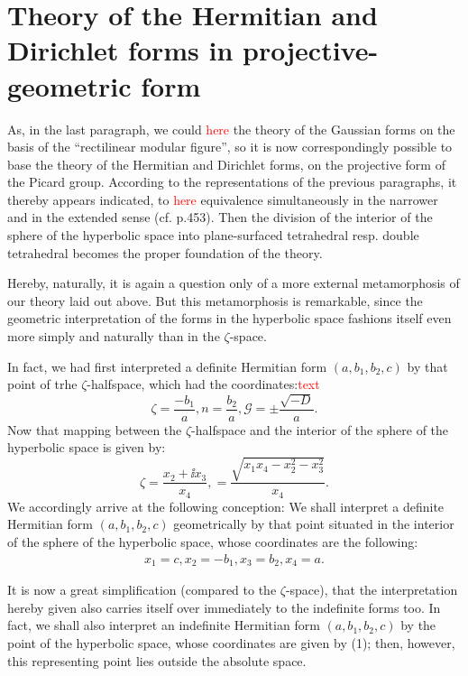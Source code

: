 \section{Theory of the Hermitian and Dirichlet forms in projective-geometric form}

As, in the last paragraph, we could \textcolor{red}{here} the theory of the Gaussian forms on the basis of the “rectilinear modular figure”, so it is now correspondingly possible to base the theory of the Hermitian and Dirichlet forms, on the projective form of the Picard group. According to the representations of the previous paragraphs, it thereby appears indicated, to \textcolor{red}{here} equivalence simultaneously in the narrower and in the extended sense (cf. p.453). Then the division of the interior of the sphere of the hyperbolic space into plane-surfaced tetrahedral resp. double tetrahedral becomes the proper foundation of the theory.

Hereby, naturally, it is again a question only of a more external metamorphosis of our theory laid out above. But this metamorphosis is remarkable, since the geometric interpretation of the forms in the hyperbolic space fashions itself even more simply and naturally than in the $\zeta$-space.

In fact, we had first interpreted a definite Hermitian form $(a,b_1,b_2,c)$ by that point of trhe $\zeta$-halfspace, which had the coordinates:\textcolor{red}{text}
$$\zeta=\frac{-b_1}{a}, n=\frac{b_2}{a}, \mathcal{G}=\pm \frac{\sqrt{-D}}{a}.$$
Now that mapping between the $\zeta$-halfspace and the interior of the sphere of the hyperbolic space is given by:
$$\zeta=\frac{x_2+\ii x_3}{x_4},=\frac{\sqrt{x_1x_4-x_2^2-x_3^2}}{x_4}.$$
We accordingly arrive at the following conception: We shall interpret a definite Hermitian form $(a,b_1,b_2,c)$ geometrically by that point situated in the interior of the sphere of the hyperbolic space, whose coordinates are the following:
\begin{align}
x_1=c,x_2=-b_1,x_3=b_2,x_4=a.
\end{align}

It is now a great simplification (compared to the $\zeta$-space), that the interpretation hereby given also carries itself over immediately to the indefinite forms too. In fact, we shall also interpret an indefinite Hermitian form $(a,b_1,b_2,c)$ by the point of the hyperbolic space, whose coordinates are given by (1); then, however, this representing point lies outside the absolute space.


